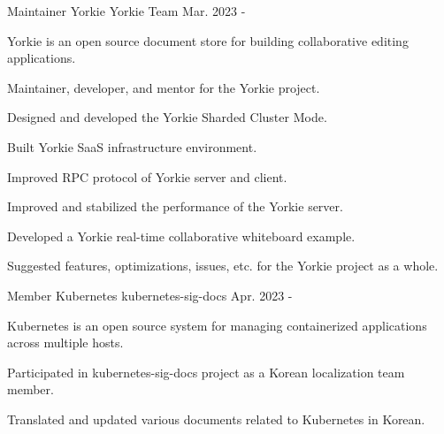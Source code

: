

\begin{cventries}

  \cventry
    {Maintainer} %
    {Yorkie} %
    {Yorkie Team} %
    {Mar. 2023 - } %
    {
      \begin{cvitems} %
        \item {Yorkie is an open source document store for building collaborative editing applications.}
        \item {Maintainer, developer, and mentor for the Yorkie project.}
        \item {Designed and developed the Yorkie Sharded Cluster Mode.}
        \item {Built Yorkie SaaS infrastructure environment.}
        \item {Improved RPC protocol of Yorkie server and client.}
        \item {Improved and stabilized the performance of the Yorkie server.}
        \item {Developed a Yorkie real-time collaborative whiteboard example.}
        \item {Suggested features, optimizations, issues, etc. for the Yorkie project as a whole.}
      \end{cvitems}
    }

  \cventry
  {Member} %
  {Kubernetes} %
  {kubernetes-sig-docs} %
  {Apr. 2023 - } %
  {
    \begin{cvitems} %
      \item {Kubernetes is an open source system for managing containerized applications across multiple hosts.}
      \item {Participated in kubernetes-sig-docs project as a Korean localization team member.}
      \item {Translated and updated various documents related to Kubernetes in Korean.}      
    \end{cvitems}
  }


\end{cventries}
